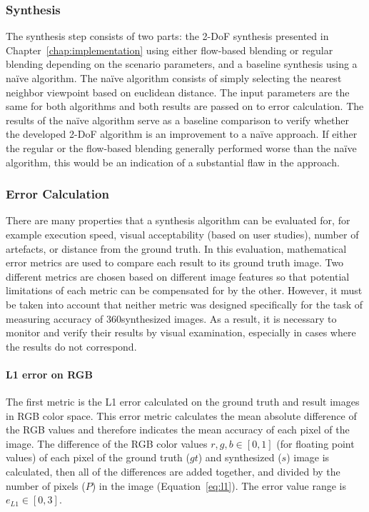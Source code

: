 \subsubsection{Synthesis}
The synthesis step consists of two parts: the 2-DoF synthesis presented in Chapter~\ref{chap:implementation} using either flow-based blending or regular blending depending on the scenario parameters, and a baseline synthesis using a na\"ive algorithm.
The na\"ive algorithm consists of simply selecting the nearest neighbor viewpoint based on euclidean distance. The input parameters are the same for both algorithms and both results are passed on to error calculation.
The results of the na\"ive algorithm serve as a baseline comparison to verify whether the developed 2-DoF algorithm is an improvement to a na\"ive approach. If either the regular or the flow-based blending generally performed worse than the na\"ive algorithm, this would be an indication of a substantial flaw in the approach.

\subsubsection{Error Calculation}
There are many properties that a synthesis algorithm can be evaluated for, for example execution speed, visual acceptability (based on user studies), number of artefacts, or distance from the ground truth. In this evaluation, mathematical
error metrics are used to compare each result to its ground truth image.  Two different metrics are chosen based on different image features so that potential limitations of each metric can be compensated for by the other. However, it must be taken into account that neither metric was designed specifically for the task of measuring accuracy of 360\degree synthesized images. As a result, it is necessary to monitor and verify their results by visual examination, especially in cases where the results do not correspond.

\paragraph{L1 error on RGB}
The first metric is the L1 error calculated on the ground truth and result images in RGB color space. This error metric calculates the mean absolute difference of the RGB values and therefore indicates the mean accuracy of each pixel of the image. 
The difference of the RGB color values $r,g,b \in [0,1]$ (for floating point values) of each pixel of the ground truth ($gt$) and synthesized ($s$) image is calculated, then all of the differences are added together, and divided by the number of pixels ($P$) in the image (Equation~\ref{eq:l1}). The error value range is $e_{L1} \in [0,3]$.

